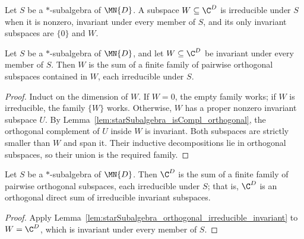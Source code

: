 \begin{definition}%
    \label{def:starSubalgebra_irreducibleSubspace}
    \leanok
    Let $S$ be a $*$-subalgebra of $\MN{D}$. A subspace
    $W\subseteq\C^D$ is irreducible under $S$ when it is nonzero, invariant
    under every member of $S$, and its only invariant subspaces are
    $\{0\}$ and $W$.
\end{definition}

\begin{lemma}%
    \label{lem:starSubalgebra_orthogonal_irreducible_invariant}
    \leanok
    Let $S$ be a $*$-subalgebra of $\MN{D}$, and let
    $W\subseteq\C^D$ be invariant under every member of $S$. Then $W$ is
    the sum of a finite family of pairwise orthogonal subspaces contained in
    $W$, each irreducible under $S$.
\end{lemma}

\begin{proof}
    \leanok
    Induct on the dimension of $W$. If $W=0$, the empty family works; if
    $W$ is irreducible, the family $\{W\}$ works. Otherwise, $W$ has a
    proper nonzero invariant subspace $U$. By
    Lemma~\ref{lem:starSubalgebra_isCompl_orthogonal}, the orthogonal
    complement of $U$ inside $W$ is invariant. Both subspaces are strictly
    smaller than $W$ and span it. Their inductive decompositions lie in
    orthogonal subspaces, so their union is the required family.
\end{proof}

\begin{theorem}%
    \label{thm:starSubalgebra_orthogonal_irreducible_decomposition}
    \leanok
    Let $S$ be a $*$-subalgebra of $\MN{D}$. Then $\C^D$ is the sum of a
    finite family of pairwise orthogonal subspaces, each irreducible under
    $S$; that is, $\C^D$ is an orthogonal direct sum of irreducible
    invariant subspaces.
\end{theorem}

\begin{proof}
    \leanok
    Apply
    Lemma~\ref{lem:starSubalgebra_orthogonal_irreducible_invariant} to
    $W=\C^D$, which is invariant under every member of $S$.
\end{proof}


